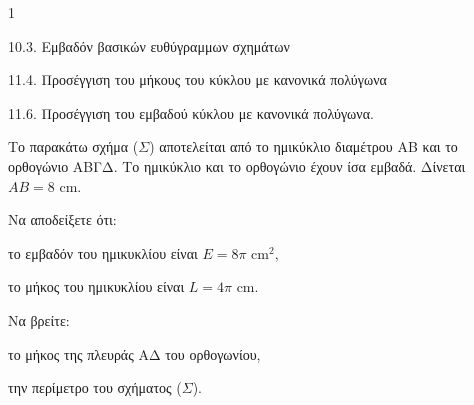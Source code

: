 \begin{ylh}{1}
    \item 10.3. Εμβαδόν βασικών ευθύγραμμων σχημάτων
    \item 11.4. Προσέγγιση του μήκους του κύκλου με κανονικά πολύγωνα
    \item 11.6. Προσέγγιση του εμβαδού κύκλου με κανονικά πολύγωνα.
\end{ylh}
\begin{figure} %
    \centering
\end{figure}
Το παρακάτω σχήμα ($\Sigma$) αποτελείται από το ημικύκλιο διαμέτρου ΑΒ και το ορθογώνιο ΑΒΓΔ. Το ημικύκλιο και το ορθογώνιο έχουν ίσα εμβαδά. Δίνεται $ΑΒ = 8 \text{ cm}$.
\begin{alist}
    \item Να αποδείξετε ότι:
    \begin{rlist}
        \item το εμβαδόν του ημικυκλίου είναι $E = 8\pi \text{ cm}^2$, 
        \item το μήκος του ημικυκλίου είναι $L = 4\pi \text{ cm}$. 
    \end{rlist}
    \item Να βρείτε:
    \begin{rlist}
        \item το μήκος της πλευράς ΑΔ του ορθογωνίου, 
        \item την περίμετρο του σχήματος ($\Sigma$). 
    \end{rlist}
\end{alist}